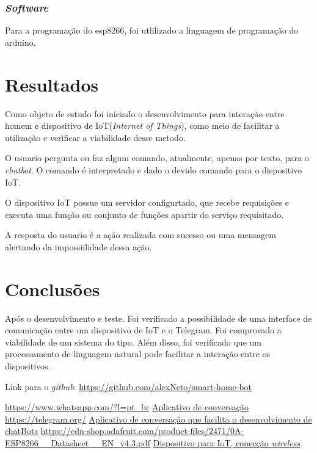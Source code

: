 \documentclass[10pt,a4paper,twocolumn]{article}
\begin{document}
\subsubsection{\textit{Software}}
Para a programação do esp8266, foi utlilizado a linguagem de programação do arduino.

\section{\bf Resultados}
Como objeto de estudo foi iniciado o desenvolvimento para interação entre homem e dispositivo de IoT(\textit{Internet of Things}), como meio de facilitar a utilização e verificar a viabilidade desse metodo.


O usuario pergunta ou faz algum comando, atualmente, apenas por texto, para o \textit{chatbot}. O comando é interpretado e dado o devido comando para o dispositivo IoT.


O dispositivo IoT possue um servidor configurtado, que recebe requisições e executa uma função ou conjunto de funções apartir do serviço requisitado.


A resposta do usuario é a ação realizada com sucesso ou uma mensagem alertando da impossiilidade dessa ação.
\section{\bf Conclusões}
Após o desenvolvimento e teste. Foi verificado a possibilidade de uma interface de comunicação entre um dispositivo de  IoT e o Telegram. Foi comprovado a viabilidade de um sistema do tipo. Além disso, foi verificado que um processamento de linguagem natural pode facilitar a interação entre os dispositivos.

 Link para o \textit{github}: \url{https://github.com/alexNeto/smart-home-bot}


\begin{thebibliography}{99}
 \url{https://www.whatsapp.com/?l=pt_br}
\href{https://www.whatsapp.com/?l=pt_br}{Aplicativo de conversação}
  \url{https://telegram.org/}
\href{https://telegram.org/}{Aplicativo de conversação que facilita o desenvolvimento de chatBots}
 \url{https://cdn-shop.adafruit.com/product-files/2471/0A-ESP8266__Datasheet__EN_v4.3.pdf}
\href{https://cdn-shop.adafruit.com/product-files/2471/0A-ESP8266__Datasheet__EN_v4.3.pdf}{Dispositivo para IoT, conecção \textit{wireless}} 
\end{thebibliography}
\end{document}
